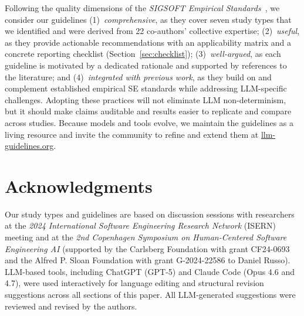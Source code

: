 \documentclass[smallextended]{svjour3}
\begin{document}
Following the quality dimensions of the \emph{SIGSOFT Empirical
Standards}~\cite{ralph2021empiricalstandardssoftwareengineering}, we
consider our guidelines
(1)~\emph{comprehensive}, as they cover seven study types that we
identified and were derived from 22 co-authors' collective expertise;
(2)~\emph{useful}, as they provide actionable recommendations with an
applicability matrix and a concrete reporting checklist
(Section~\ref{sec:checklist});
(3)~\emph{well-argued}, as each guideline is motivated by a dedicated
rationale and supported by references to the literature; and
(4)~\emph{integrated with previous work}, as they build on and
complement established empirical SE standards while addressing
LLM-specific challenges.
Adopting these practices will not eliminate LLM non-determinism, but it
should make claims auditable and results easier to replicate and compare
across studies.
Because models and tools evolve, we maintain the guidelines as a living
resource and invite the community to refine and extend them at
\href{https://llm-guidelines.org/}{llm-guidelines.org}.

\section*{Acknowledgments}

Our study types and guidelines are based on discussion sessions with researchers at the \emph{2024 International Software Engineering Research Network} (ISERN) meeting and at the \emph{2nd Copenhagen Symposium on Human-Centered Software Engineering AI} (supported by the Carlsberg Foundation with grant CF24-0693 and the Alfred P. Sloan Foundation with grant G-2024-22586 to Daniel Russo).
LLM-based tools, including ChatGPT (GPT-5) and Claude Code (Opus 4.6 and 4.7), were used interactively for language editing and structural revision suggestions across all sections of this paper. All LLM-generated suggestions were reviewed and revised by the authors.
\end{document}

